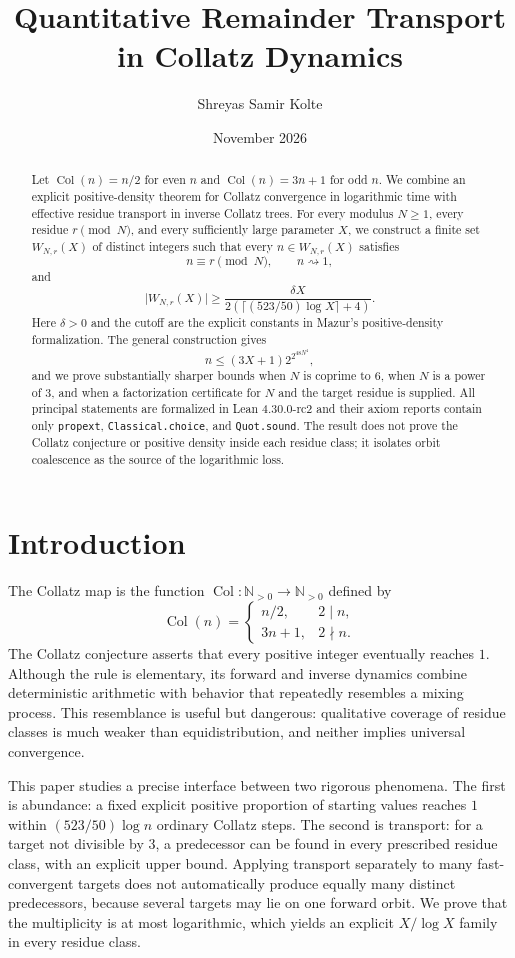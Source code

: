 \documentclass[11pt]{article}
\title{Quantitative Remainder Transport in Collatz Dynamics}
\author{Shreyas Samir Kolte}
\date{November 2026}
\theoremstyle{definition}
\theoremstyle{remark}
\newcommand{\N}{\mathbb N}
\newcommand{\Col}{\operatorname{Col}}
\newcommand{\Reach}{\rightsquigarrow}
\newcommand{\card}[1]{\lvert #1\rvert}
\begin{document}
\maketitle

\begin{abstract}
Let $\Col(n)=n/2$ for even $n$ and $\Col(n)=3n+1$ for odd $n$.
We combine an explicit positive-density theorem for Collatz convergence in
logarithmic time with effective residue transport in inverse Collatz trees.
For every modulus $N\ge 1$, every residue $r\pmod N$, and every sufficiently
large parameter $X$, we construct a finite set $W_{N,r}(X)$ of distinct
integers such that every $n\in W_{N,r}(X)$ satisfies
\[
 n\equiv r\pmod N,\qquad n\Reach 1,
\]
and
\[
 \card{W_{N,r}(X)}\ge
 \frac{\delta X}{2(\lceil (523/50)\log X\rceil+4)}.
\]
Here $\delta>0$ and the cutoff are the explicit constants in Mazur's
positive-density formalization.  The general construction gives
\[
 n\le (3X+1)2^{2^{48N^4}},
\]
and we prove substantially sharper bounds when $N$ is coprime to $6$, when
$N$ is a power of $3$, and when a factorization certificate for $N$ and the
target residue is supplied.  All principal statements are formalized in Lean
4.30.0-rc2 and their axiom reports contain only \texttt{propext},
\texttt{Classical.choice}, and \texttt{Quot.sound}.  The result does not prove
the Collatz conjecture or positive density inside each residue class; it
isolates orbit coalescence as the source of the logarithmic loss.
\end{abstract}

\section{Introduction}
The Collatz map is the function $\Col:\N_{>0}\to\N_{>0}$ defined by
\[
 \Col(n)=\begin{cases}n/2,&2\mid n,\\3n+1,&2\nmid n.\end{cases}
\]
The Collatz conjecture asserts that every positive integer eventually reaches
$1$.  Although the rule is elementary, its forward and inverse dynamics
combine deterministic arithmetic with behavior that repeatedly resembles a
mixing process.  This resemblance is useful but dangerous: qualitative
coverage of residue classes is much weaker than equidistribution, and neither
implies universal convergence.

This paper studies a precise interface between two rigorous phenomena.  The
first is abundance: a fixed explicit positive proportion of starting values
reaches $1$ within $(523/50)\log n$ ordinary Collatz steps.  The second is
transport: for a target not divisible by $3$, a predecessor can be found in
every prescribed residue class, with an explicit upper bound.  Applying
transport separately to many fast-convergent targets does not automatically
produce equally many distinct predecessors, because several targets may lie
on one forward orbit.  We prove that the multiplicity is at most logarithmic,
which yields an explicit $X/\log X$ family in every residue class.
\end{document}
